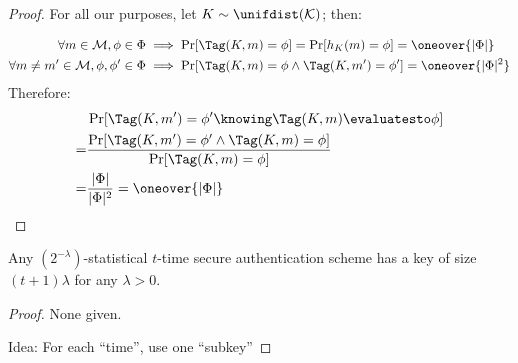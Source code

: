 \begin{proof}
    For all our purposes, let $K \sim \unifdist(\K)$; then:

    \begin{align*}
        \forall m \in \M, \phi \in \Phi &\implies \Pr[\Tag(K, m) = \phi] = \Pr[h_K(m) = \phi] = \oneover{|\Phi|} \\
        \forall m \neq m' \in \M, \phi, \phi' \in \Phi &\implies \Pr[\Tag(K, m) = \phi \wedge \Tag(K, m') = \phi'] = \oneover{|\Phi|^2} \\
    \end{align*}
    Therefore:
    \begin{align*}
        & \Pr[\Tag(K, m') = \phi' \knowing \Tag(K, m) \evaluatesto \phi] \\
        =& \frac{\Pr[\Tag(K, m') = \phi' \wedge \Tag(K, m) = \phi]}{\Pr[\Tag(K, m) = \phi]} \\
        =& \frac{|\Phi|}{|\Phi|^2} = \oneover{|\Phi|}
    \end{align*}
\end{proof}

\begin{theorem}
    Any $(2^{-\lambda})$-statistical $t$-time secure authentication scheme has a key of size $(t + 1) \lambda$ for any $\lambda > 0$.
\end{theorem}

\begin{proof}
    None given.

    Idea: For each ``time'', use one ``subkey''
\end{proof}

